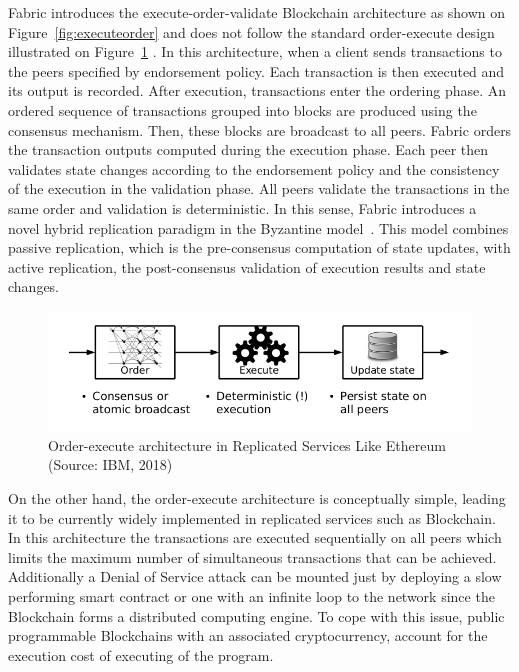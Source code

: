 Fabric introduces the execute-order-validate Blockchain architecture as shown
on Figure~\ref{fig:executeorder} and does not follow the standard order-execute
design illustrated on Figure~\ref{fig:orderexecute} \cite{Androulaki2018}. In
this architecture, when a client sends transactions to the peers specified by
endorsement policy. Each transaction is then executed and its output is
recorded. After execution, transactions enter the ordering phase. An ordered
sequence of transactions grouped into blocks are produced using the consensus
mechanism. Then, these blocks are broadcast to all peers. Fabric orders the
transaction outputs computed during the execution phase. Each peer then
validates state changes according to the endorsement policy and the consistency
of the execution in the validation phase. All peers validate the transactions
in the same order and validation is deterministic. In this sense, Fabric
introduces a novel hybrid replication paradigm in the Byzantine
model~\cite{Androulaki2018}. This model combines passive replication, which is
the pre-consensus computation of state updates, with active replication, the
post-consensus validation of execution results and state changes.

\begin{figure}[h]
  \centering
  \includegraphics[width=0.8\linewidth]{imgs/orderExecuteArchitecture.png}
  \caption{\label{fig:orderexecute} Order-execute architecture in Replicated
  Services Like Ethereum (Source: IBM, 2018)}
\end{figure}

On the other hand, the order-execute architecture is conceptually simple,
leading it to be currently widely implemented in replicated services such as
Blockchain. In this architecture the transactions are executed sequentially on
all peers which limits the maximum number of simultaneous transactions that can
be achieved.  Additionally a Denial of Service attack can be mounted just by
deploying a slow performing smart contract or one with an infinite loop to the
network since the Blockchain forms a distributed computing engine.  To cope
with this issue, public programmable Blockchains with an associated
cryptocurrency, account for the execution cost of executing of the program.

